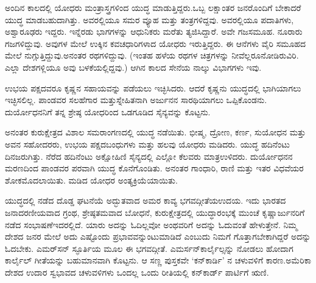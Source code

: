 \vskip 0.1cm

ಅಂದಿನ ಕಾಲದಲ್ಲಿ ಯೋಧರು ಮಂತ್ರಾಸ್ತ್ರಗಳಿಂದ ಯುದ್ಧ ಮಾಡುತ್ತಿದ್ದರು.\break ಒಬ್ಬ ಲಕ್ಷಾಂತರ ಜನರೊಂದಿಗೆ ಬೇಕಾದರೆ ಯುದ್ಧ ಮಾಡಬಹುದಾಗಿತ್ತು. ಅವರಲ್ಲಿಯೂ ಸಮರ ವ್ಯೂಹ ಮತ್ತು ತಂತ್ರಗಳಿದ್ದವು. ಅವರಲ್ಲಿಯೂ ಪದಾತಿಗಳು, ಅಶ್ವಾರೂಢರು ಇದ್ದರು. ಇನ್ನೆರಡು ಭಾಗಗಳನ್ನು ಆಧುನಿಕರು ಮರೆತು ತ್ಯಜಿಸಿದ್ದಾರೆ. ಅವೇ ಗಜ\break ಸಮೂಹ. ನೂರಾರು ಗಜಗಳಿದ್ದುವು. ಅವುಗಳ ಮೇಲೆ ಉಕ್ಕಿನ ಕವಚಧಾರಿಗಳಾದ ಯೋಧರು ಇರುತ್ತಿದ್ದರು. ಈ ಆನೆಗಳು ವೈರಿ ಸಮೂಹದ ಮೇಲೆ ನುಗ್ಗುತ್ತಿದ್ದುವು.\break ಅನಂತರ ರಥಗಳಿದ್ದುವು. (ಇಂತಹ ಹಳೆಯ ರಥಗಳ ಚಿತ್ರಗಳನ್ನು ನೀವೆಲ್ಲರೂ\break ನೋಡಿರುವಿರಿ. ಎಲ್ಲಾ ದೇಶಗಳ್ಲಿಯೂ ಅವು ಬಳಕೆಯಲ್ಲಿದ್ದವು.) ಆಗಿನ ಕಾಲದ ಸೇನೆಯ ನಾಲ್ಕು ವಿಭಾಗಗಳು ಇವು.

\vskip 0.1cm

ಉಭಯ ಪಕ್ಷದವರೂ ಕೃಷ್ಣನ ಸಹಾಯವನ್ನು ಪಡೆಯಲು ಇಚ್ಛಿಸಿದರು. ಆದರೆ ಕೃಷ್ಣನು ಯುದ್ಧದಲ್ಲಿ ಭಾಗಿಯಾಗಲು ಇಚ್ಛಿಸಲಿಲ್ಲ. ಪಾಂಡವರ ಸಲಹೆಗಾರ ಮತ್ತು\break ಸ್ನೇಹಿತನಾಗಿ ಅರ್ಜುನನ ಸಾರಥಿಯಾಗಲು ಒಪ್ಪಿಕೊಂಡನು. ದುರ್ಯೋಧನನಿಗೆ ತನ್ನ ಶ್ರೇಷ್ಠ ಯೋಧರಿಂದ ಒಡಗೂಡಿದ ಸೈನ್ಯವನ್ನು ಕೊಟ್ಟನು.

\vskip 0.1cm

ಅನಂತರ ಕುರುಕ್ಷೇತ್ರದ ವಿಶಾಲ ಸಮರಾಂಗಣದಲ್ಲಿ ಯುದ್ಧ ನಡೆಯಿತು. ಭೀಷ್ಮ, ದ್ರೋಣ, ಕರ್ಣ, ಸುಯೋಧನ ಮತ್ತು ಅವನ ಸಹೋದರರು, ಉಭಯ ಪಕ್ಷದ\break ಬಂಧುಗಳು ಮತ್ತು ಹಲವು ಯೋಧರು ಮಡಿದರು. ಯುದ್ಧ ಹದಿನೆಂಟು ದಿನ\break ಜರುಗಿತ್ತು. ನೆರೆದ ಹದಿನೆಂಟು ಅಕ್ಷೋಹಿಣಿ ಸೈನ್ಯದಲ್ಲಿ ಎಲ್ಲೋ ಕೆಲವರು ಮಾತ್ರ\break ಉಳಿದರು. ದುರ್ಯೋಧನನ ಮರಣದಿಂದ ಪಾಂಡವರ ಪರವಾಗಿ ಯುದ್ಧ ಕೊನೆಗೊಂಡಿತು. ಅನಂತರ ಗಾಂಧಾರಿ, ರಾಣಿ ಮತ್ತು ಇತರ ವಿಧವೆಯರ ಶೋಕ\break ಮೊದಲಾಯಿತು. ಮಡಿದ ಯೋಧರ ಅಂತ್ಯಕ್ರಿಯೆಯಾಯಿತು.

\vskip 0.1cm

ಯುದ್ಧದಲ್ಲಿ ನಡೆದ ದೊಡ್ಡ ಘಟನೆಯೆ ಅದ್ಭುತವಾದ ಅಮರ ಕಾವ್ಯ ಭಗವದ್ಗೀತೆಯ\break ಉದಯ. ಇದು ಭಾರತದ ಜನಾದರಣೀಯವಾದ ಗ್ರಂಥ, ಶ್ರೇಷ್ಠತಮವಾದ ಬೋಧನೆ, ಕುರುಕ್ಷೇತ್ರದಲ್ಲಿ ಯುದ್ಧಾರಂಭಕ್ಕೆ ಮುಂಚೆ ಕೃಷ್ಣಾರ್ಜುನರಿಗೆ ನಡೆದ ಸಂಭಾಷಣೆ\break ಇದರಲ್ಲಿದೆ. ಯಾರು ಅದನ್ನು ಓದಿಲ್ಲವೋ ಅಂಥವರಿಗೆ ಅದನ್ನು ಓದುವಂತೆ ಹೇಳುತ್ತೇನೆ. ನಿಮ್ಮ ದೇಶದ ಜನರ ಮೇಲೆ ಅದು ಎಷ್ಟೊಂದು ಪ್ರಭಾವವನ್ನುಂಟುಮಾಡಿದೆ ಎಂಬುದು ನಿಮಗೆ ಗೊತ್ತಾಗಬೇಕಾಗಿದ್ದರೆ ಅದನ್ನು ಓದಬೇಕು. ಎಮರ್​ಸನ್​ ಸ್ಫೂರ್ತಿಯ ಮೂಲ ಈ ಭಗವದ್ಗೀತೆ. ಎಮರ್ಸನ್​ ಕಾರ್ಲೈಲ್ಸನ್ನು ನೋಡಲು ಹೋದಾಗ ಕಾರ್ಲೈಲ್​ ಗೀತೆಯನ್ನು ಬಹುಮಾನವಾಗಿ ಕೊಟ್ಟನು. ಆ ಸಣ್ಣ ಪುಸ್ತಕವೇ ‘ಕನ್​ಕಾರ್ಡಿ’ ನ ಚಳುವಳಿಗೆ ಕಾರಣ.\break ಅಮೆರಿಕಾ ದೇಶದ ಉದಾರ ಸ್ವಭಾವದ ಚಳುವಳಿಗಳು ಒಂದಲ್ಲ ಒಂದು ರೀತಿಯಲ್ಲಿ ಕನ್​ಕಾರ್ಡ್​ ಪಾರ್ಟಿಗೆ ಋಣಿ.

\vskip 0.1cm

